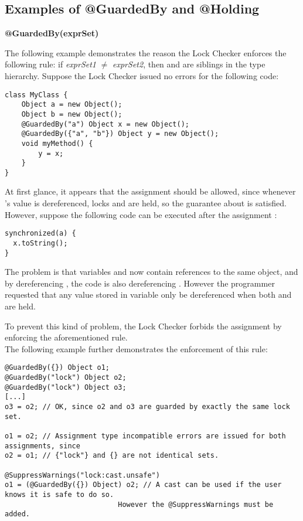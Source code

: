 \subsection{Examples of @GuardedBy and @Holding\label{lock-examples-guardedby-and-holding}}

\textbf{@GuardedBy(exprSet)}

The following example demonstrates the reason the Lock Checker enforces the
following rule:  if \emph{exprSet1} $\neq$ \emph{exprSet2}, then
 and  are siblings in the type
hierarchy.  Suppose the Lock Checker issued no errors for the following code:

\begin{Verbatim}
class MyClass {
    Object a = new Object();
    Object b = new Object();
    @GuardedBy("a") Object x = new Object();
    @GuardedBy({"a", "b"}) Object y = new Object();
    void myMethod() {
        y = x;
    }
}
\end{Verbatim}

At first glance, it appears that the assignment should be allowed, since
whenever 's value is dereferenced, locks  and  are
held, so the guarantee about  is satisfied.  However, suppose the
following code can be executed after the assignment :

\begin{Verbatim}
synchronized(a) {
  x.toString();
}
\end{Verbatim}

The problem is that variables  and  now contain references to
the same object, and by dereferencing , the code is also dereferencing
.  However the programmer requested that any value stored in variable
 only be dereferenced when both  and  are held.

To prevent this kind of problem, the Lock Checker forbids the assignment
 by enforcing the aforementioned rule.
\\

The following example further demonstrates the enforcement of this rule:

\begin{Verbatim}
@GuardedBy({}) Object o1;
@GuardedBy("lock") Object o2;
@GuardedBy("lock") Object o3;
[...]
o3 = o2; // OK, since o2 and o3 are guarded by exactly the same lock set.

o1 = o2; // Assignment type incompatible errors are issued for both assignments, since
o2 = o1; // {"lock"} and {} are not identical sets.

@SuppressWarnings("lock:cast.unsafe")
o1 = (@GuardedBy({}) Object) o2; // A cast can be used if the user knows it is safe to do so.
                           However the @SuppressWarnings must be added.
\end{Verbatim}





